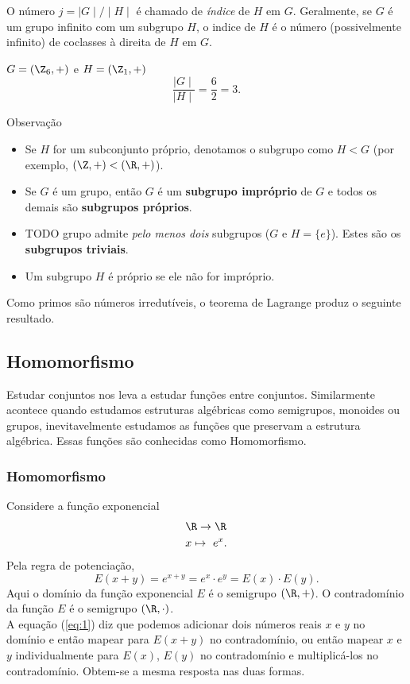          O número $j = \mid G\mid / \mid H\mid$ é chamado de \emph{índice} de $H$ em $G$. Geralmente, se $G$ é um grupo infinito com um subgrupo $H$, o indice de $H$ é o número (possivelmente infinito) de coclasses à direita de $H$ em $G$.
         \begin{exmp}
            $G=(\Z_{6},+)$ e $H=(\Z_{1},+)$
            $$\dfrac{\mid G \mid}{\mid H \mid} = \dfrac{6}{2} = 3.$$
         \end{exmp}
         \begin{mymdframed}{Observação}
         \begin{itemize}
            \item Se $H$ for um subconjunto próprio, denotamos o subgrupo como $H < G$ (por exemplo, $(\Z, +) < (\R, +)$).
            \item Se $G$ é um grupo, então $G$ é um \textbf{subgrupo impróprio} de $G$ e todos os demais são \textbf{subgrupos próprios}.
            \item TODO grupo admite \emph{pelo menos dois} subgrupos ($G$ e $H = \{e\}$). Estes são os \textbf{subgrupos triviais}.
            \item Um subgrupo $H$ é próprio se ele não for impróprio.
         \end{itemize}
         \end{mymdframed}
         Como primos são números irredutíveis, o teorema de Lagrange produz o seguinte resultado.

   \subsection{Homomorfismo}
      Estudar conjuntos nos leva a estudar funções entre conjuntos. Similarmente acontece quando estudamos estruturas algébricas como semigrupos, monoides ou grupos, inevitavelmente estudamos as funções que preservam a estrutura algébrica. Essas funções são conhecidas como Homomorfismo.
      \subsubsection{Homomorfismo}
         Considere a função exponencial
         \begin{alignat}{2}
            &\R \to \R \nonumber\\
            &x \mapsto\ e^{x}.
            \nonumber
         \end{alignat}
         Pela regra de potenciação,
         \begin{equation}\label{eq:1}
            E(x+y)=e^{x+y} = e^{x}\cdot e^{y} = E(x)\cdot E(y).  
         \end{equation}
         Aqui o domínio da função exponencial $E$ é o semigrupo $(\R,+)$. O contradomínio da função $E$ é o semigrupo $(\R,\cdot)$.\\
         A equação (\ref{eq:1}) diz que podemos adicionar dois números reais $x$ e $y$ no domínio e então mapear para $E(x+y)$ no contradomínio, ou então mapear $x$ e $y$ individualmente para $E(x)$, $E(y)$ no contradomínio e multiplicá-los no contradomínio. Obtem-se a mesma resposta nas duas formas.

